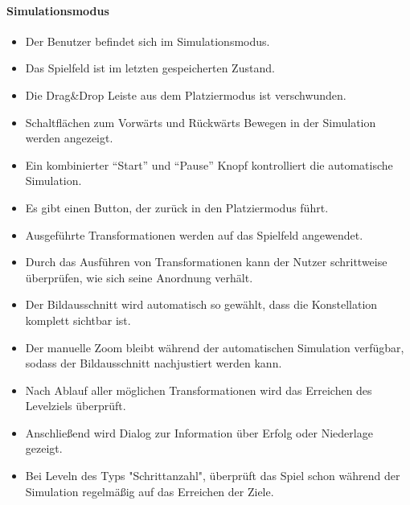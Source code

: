 \paragraph{Simulationsmodus}
\begin{itemize}
\item Der Benutzer befindet sich im Simulationsmodus.
\item Das Spielfeld ist im letzten gespeicherten Zustand.
\item Die Drag\&Drop Leiste aus dem Platziermodus ist verschwunden.
\item Schaltflächen zum Vorwärts und Rückwärts Bewegen in der Simulation werden angezeigt.
\item Ein kombinierter "`Start"' und "`Pause"' Knopf kontrolliert die automatische Simulation.
\item Es gibt einen Button, der zurück in den Platziermodus führt.
\item Ausgeführte Transformationen werden auf das Spielfeld angewendet.
\item Durch das Ausführen von Transformationen kann der Nutzer schrittweise
überprüfen, wie sich seine Anordnung verhält.
\item Der Bildausschnitt wird automatisch so gewählt, dass die Konstellation komplett sichtbar ist.
\item Der manuelle Zoom bleibt während der automatischen Simulation verfügbar, sodass der Bildausschnitt nachjustiert werden kann.
\item Nach Ablauf aller möglichen Transformationen wird das Erreichen des Levelziels überprüft.
\item Anschließend wird Dialog zur Information über Erfolg oder Niederlage gezeigt.
\item Bei Leveln des Typs "Schrittanzahl", überprüft das Spiel schon während der Simulation regelmäßig auf das Erreichen
der Ziele.
\end{itemize}

